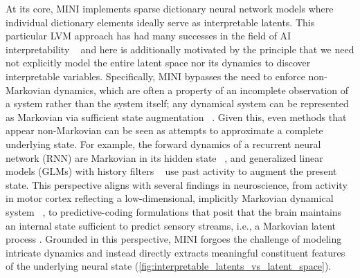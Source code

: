 At its core, MINI implements sparse dictionary neural network models where individual dictionary elements ideally serve as interpretable latents. This particular LVM approach has had many successes in the field of AI interpretability ~\cite{cunningham_2023_saes, bricken_2023_towards_monosemanticity, templeton_2024_scaling_monosemanticity, ameisen_2025_circuit_tracing, lindsey_2025_biology_llm} and here is additionally motivated by the principle that we need not explicitly model the entire latent space nor its dynamics to discover interpretable variables. Specifically, MINI bypasses the need to enforce non-Markovian dynamics, which are often a property of an incomplete observation of a system rather than the system itself; any dynamical system can be represented as Markovian via sufficient state augmentation ~\cite{takens_1981_embedding}. Given this, even methods that appear non-Markovian can be seen as attempts to approximate a complete underlying state. For example, the forward dynamics of a recurrent neural network (RNN) are Markovian in its hidden state ~\cite{sussillo_2013_rnn_dynamics, goodfellow_2016_rnn}, and generalized linear models (GLMs) with history filters ~\cite{pillow_2008_glms, truccolo_2005_pointprocess} use past activity to augment the present state. This perspective aligns with several findings in neuroscience, from activity in motor cortex reflecting a low-dimensional, implicitly Markovian dynamical system ~\cite{churchland_2012_population_dynamics, shenoy_2013_dynamical_perspective}, to predictive-coding formulations that posit that the brain maintains an internal state sufficient to predict sensory streams, i.e., a Markovian latent process \cite{rao_1999_predictive_coding, doya_2007_bayesian_brain, friston_2010_free_energy}. Grounded in this perspective, MINI forgoes the challenge of modeling intricate dynamics and instead directly extracts meaningful constituent features of the underlying neural state (\autoref{fig:interpretable_latents_vs_latent_space}).

